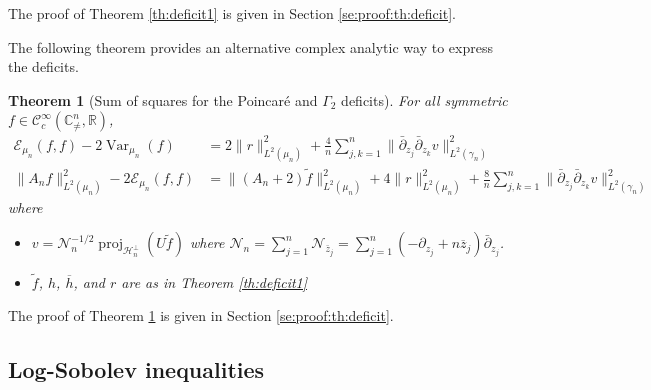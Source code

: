 \documentclass[11pt,reqno]{amsart}
\numberwithin{equation}{section}%
\numberwithin{figure}{section}%
\numberwithin{table}{section}
\theoremstyle{plain}
\newtheorem{theorem}{Theorem}[section]
\theoremstyle{definition}
\begin{document}
The proof of Theorem \ref{th:deficit1} is given in Section \ref{se:proof:th:deficit}.

The following theorem provides an alternative complex analytic way to express the deficits.

\begin{theorem}[Sum of squares for the Poincaré and $\Gamma_2$ deficits]
  \label{th:deficit2}
  For all symmetric
  $f\in\mathcal{C}^\infty_c(\mathbb{C}^n_{\neq},\mathbb{R})$,
  \begin{align}
    \mathcal{E}_{\mu_n}(f,f)-2\operatorname{Var}_{\mu_n}(f)
    &=2\|r\|_{L^2(\mu_n)}^2
      +\frac{4}{n}\sum_{j,k=1}^n\|\bar\partial_{z_j}\bar\partial_{z_k}v\|_{L^2(\gamma_n)}^2
      \label{eq:poincare-deficit-differential-squares}\\
    \|A_nf\|_{L^2(\mu_n)}^2-2\mathcal{E}_{\mu_n}(f,f)
    &=\|(A_n+2)\widetilde f\|_{L^2(\mu_n)}^2
      +4\|r\|_{L^2(\mu_n)}^2
      +\frac{8}{n}\sum_{j,k=1}^n\|\bar\partial_{z_j}\bar\partial_{z_k}v\|_{L^2(\gamma_n)}^2
      \label{eq:gamma-two-deficit-differential-squares}
  \end{align}    
  where
  \begin{itemize}
  \item
    $v =
    \mathcal{N}_n^{-1/2}\operatorname{proj}_{\mathcal{H}_n^\perp}(U\widetilde
    f)$ where
    $\mathcal{N}_n
    =\sum_{j=1}^n\mathcal{N}_{\bar{z}_j}=\sum_{j=1}^n(-\partial_{z_j}+n\overline
    z_j)\bar\partial_{z_j}$.
  \item $\widetilde f$, $h$, $\overline h$, and $r$ are as in Theorem \ref{th:deficit1}
  \end{itemize}
\end{theorem}


The proof of Theorem \ref{th:deficit2} is given in Section \ref{se:proof:th:deficit}.

\subsection{Log-Sobolev inequalities}
\end{document}

